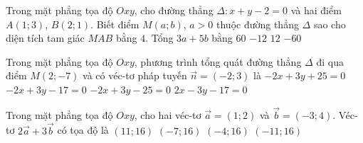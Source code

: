 \begin{ex}%
	Trong mặt phẳng tọa độ $Oxy$, cho đường thẳng $\Delta\colon x+y-2=0$ và hai điểm $A(1;3)$, $B(2;1)$. Biết điểm $M(a;b)$, $a>0$ thuộc đường thẳng $\Delta$ sao cho diện tích tam giác $MAB$ bằng $4$. Tổng $3a+5b$ bằng
	\choice
	{$60$}
	{\True $-12$}
	{$12$}
	{$-60$}
\end{ex}
\begin{ex}%
	Trong mặt phẳng tọa độ $Oxy$, phương trình tổng quát đường thẳng $\Delta$ đi qua điểm $M(2;-7)$ và có véc-tơ pháp tuyến $\vec{n}=(-2;3)$ là
	\choice
	{\True $-2x+3y+25=0$}
	{$-2x+3y-17=0$}
	{$-2x+3y-25=0$}
	{$2x-3y-17=0$}
\end{ex}
\begin{ex}%
	Trong mặt phẳng tọa độ $Oxy$, cho hai véc-tơ $\vec{a}=(1;2)$ và $\vec{b}=(-3;4)$. Véc-tơ $2\vec{a}+3\vec{b}$ có tọa độ là
	\choice
	{$(11;16)$}
	{\True $(-7;16)$}
	{$(-4;16)$}
	{$(-11;16)$}
\end{ex}
